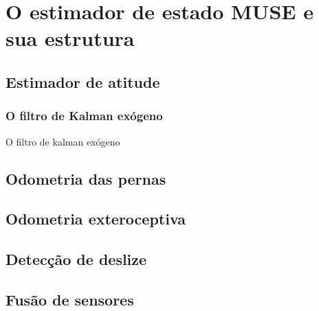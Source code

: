 \chapter{O estimador de estado MUSE e sua estrutura}

\section{Estimador de atitude}
\subsection{O filtro de Kalman exógeno}
O filtro de kalman exógeno

\section{Odometria das pernas}

\section{Odometria exteroceptiva}

\section{Detecção de deslize}

\section{Fusão de sensores}